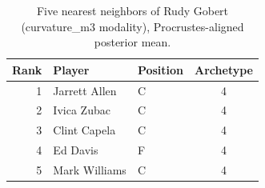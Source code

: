 \begin{table}[htbp]
  \centering\small
  \begin{tabular}{rllc}
    \toprule
    Rank & Player & Position & Archetype \\
    \midrule
    1 & Jarrett Allen & C & 4 \\
    2 & Ivica Zubac & C & 4 \\
    3 & Clint Capela & C & 4 \\
    4 & Ed Davis & F & 4 \\
    5 & Mark Williams & C & 4 \\
    \bottomrule
  \end{tabular}
  \caption{Five nearest neighbors of Rudy Gobert (curvature_m3 modality), Procrustes-aligned posterior mean.}
  \label{tab:Rudy_Gobert_neighbors_curvature_m3}
\end{table}

